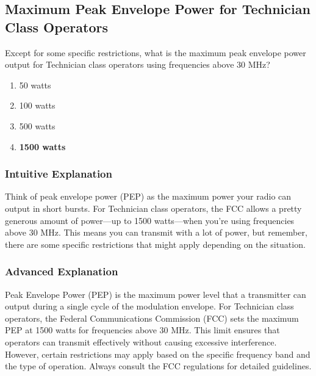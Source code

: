 \subsection{Maximum Peak Envelope Power for Technician Class Operators}
\label{T1B12}

\begin{tcolorbox}[colback=gray!10!white,colframe=black!75!black,title=T1B12]
Except for some specific restrictions, what is the maximum peak envelope power output for Technician class operators using frequencies above 30 MHz?
\begin{enumerate}[label=\Alph*),noitemsep]
    \item 50 watts
    \item 100 watts
    \item 500 watts
    \item \textbf{1500 watts}
\end{enumerate}
\end{tcolorbox}

\subsubsection*{Intuitive Explanation}
Think of peak envelope power (PEP) as the maximum power your radio can output in short bursts. For Technician class operators, the FCC allows a pretty generous amount of power—up to 1500 watts—when you're using frequencies above 30 MHz. This means you can transmit with a lot of power, but remember, there are some specific restrictions that might apply depending on the situation.

\subsubsection*{Advanced Explanation}
Peak Envelope Power (PEP) is the maximum power level that a transmitter can output during a single cycle of the modulation envelope. For Technician class operators, the Federal Communications Commission (FCC) sets the maximum PEP at 1500 watts for frequencies above 30 MHz. This limit ensures that operators can transmit effectively without causing excessive interference. However, certain restrictions may apply based on the specific frequency band and the type of operation. Always consult the FCC regulations for detailed guidelines.